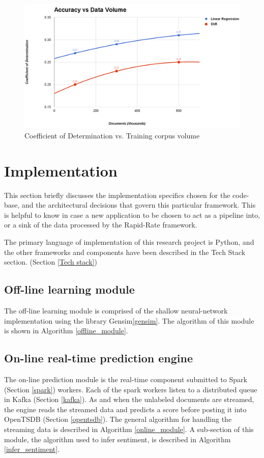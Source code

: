 \documentclass[conference]{IEEEtran}
\begin{document}
\begin{figure}[ht] \label{fig:accuracy-v-data}
    \centering
    \includegraphics[width=\textwidth]{images/accuracy-vs-data.png}
    \caption{Coefficient of Determination vs. Training corpus volume}
\end{figure}

\section{Implementation}
    This section briefly discusses the implementation specifics chosen for the code-base, and the architectural decisions that govern this particular framework. This is helpful to know in case a new application to be chosen to act as a pipeline into, or a sink of the data processed by the Rapid-Rate framework.

    The primary language of implementation of this research project is Python, and the other frameworks and components have been described in the Tech Stack section. (Section \ref{Tech stack})

    \subsection{Off-line learning module}
        The off-line learning module is comprised of the shallow neural-network implementation using the library Gensim\ref{gensim}. The algorithm of this module is shown in Algorithm \ref{offline_module}.

    \subsection{On-line real-time prediction engine}
        The on-line prediction module is the real-time component submitted to Spark (Section \ref{spark}) workers. Each of the spark workers listen to a distributed queue in Kafka (Section \ref{kafka}). As and when the unlabeled documents are streamed, the engine reads the streamed data and predicts a score before posting it into OpenTSDB (Section \ref{opentsdb}). The general algorithm for handling the streaming data is described in Algorithm \ref{online_module}. A sub-section of this module, the algorithm used to infer sentiment, is described in Algorithm \ref{infer_sentiment}.
\end{document}
